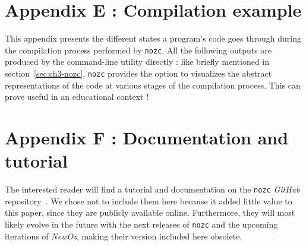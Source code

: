 \section{Appendix E : Compilation example}\label{sec:appendix-compilation}
This appendix presents the different states a program's code goes through during the compilation process performed by \texttt{nozc}.
All the following outputs are produced by the command-line utility directly : like briefly mentioned in section~\ref{sec:ch3-nozc}, \texttt{nozc} provides the option to visualizes the abstract representations of the code at various stages of the compilation process.
This can prove useful in an educational context !


\section{Appendix F : Documentation and tutorial}\label{sec:appendix-doc}
The interested reader will find a tutorial and documentation on the \texttt{nozc} \textit{GitHub} repository~\cite{NozcGitHub}.
We chose not to include them here because it added little value to this paper, since they are publicly available online.
Furthermore, they will most likely evolve in the future with the next releases of \texttt{nozc} and the upcoming iterations of \textit{NewOz}, making their version included here obsolete.